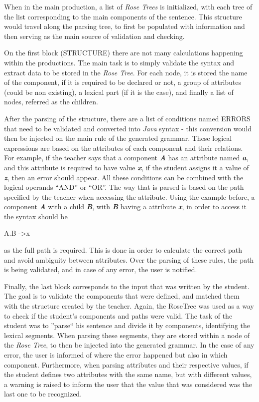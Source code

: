 When in the main production, a list of \emph{Rose Trees} is initialized, with each tree of the list corresponding to the main components of the sentence. This structure would travel along the parsing tree, to first be populated with information and then serving as the main source of validation and checking.

On the first block (STRUCTURE) there are not many calculations happening within the productions. The main task is to simply validate the syntax and extract data to be stored in the \emph{Rose Tree}. For each node, it is stored the name of the component, if it is required to be declared or not, a group of attributes (could be non existing), a lexical part (if it is the case), and finally a list of nodes, referred as the children.

After the parsing of the structure, there are a list of conditions named ERRORS that need to be validated and converted into \emph{Java} syntax - this conversion would then be injected on the main rule of the generated grammar. These logical expressions are based on the attributes of each component and their relations. For example, if the teacher says that a component \emph{\textbf{A}} has an attribute named \emph{\textbf{a}}, and this attribute is required to have value \emph{\textbf{x}}, if the student assigns it a value of \emph{\textbf{z}}, then an error should appear. All these conditions can be combined with the logical operands ``AND'' or ``OR''. The way that is parsed is based on the path specified by the teacher when accessing the attribute. Using the example before, a component \emph{\textbf{A}} with a child \emph{\textbf{B}}, with \emph{\textbf{B}} having a attribute \emph{\textbf{x}}, in order to access it the syntax should be

\begin{description}
    \Large{A.B -\textgreater x}
\end{description}
as the full path is required. This is done in order to calculate the correct path and avoid ambiguity between attributes. Over the parsing of these rules, the path is being validated, and in case of any error, the user is notified.

Finally, the last block corresponds to the input that was written by the student. The goal is to validate the components that were defined, and matched them with the structure created by the teacher. Again, the RoseTree was used as a way to check if the student’s components and paths were valid. The task of the student was to ''parse`` his sentence and divide it by components, identifying the lexical segments. When parsing these segments, they are stored within a node of the \emph{Rose Tree}, to then be injected into the generated grammar. In the case of any error, the user is informed of where the error happened but also in which component. Furthermore, when parsing attributes and their respective values, if the student defines two attributes with the same name, but with different values, a warning is raised to inform the user that the value that was considered was the last one to be recognized. 

